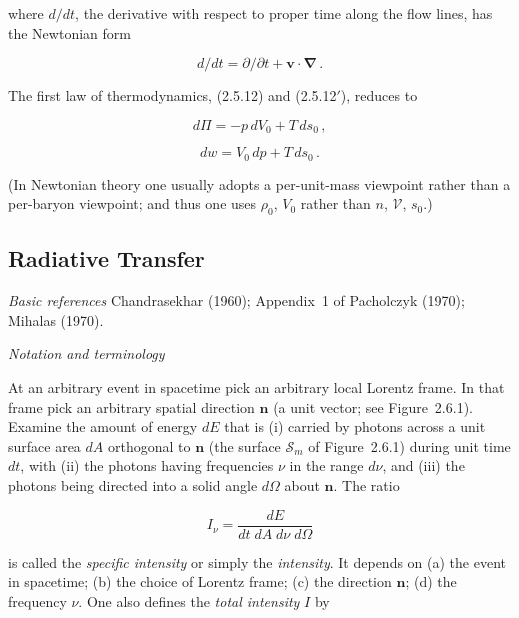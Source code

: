\documentclass[aps,prd,twocolumn,superscriptaddress,nofootinbib]{revtex4-2}
\newcommand{\fvec}[1]{\mathbf{#1}}
\begin{document}
where $d/dt$, the derivative with respect to proper time along the flow lines, has
the Newtonian form

\begin{equation}
d/dt = \partial/\partial t + \fvec{v}\cdot\boldsymbol{\nabla}\,.
\tag{2.5.40}
\end{equation}

The first law of thermodynamics, (2.5.12) and (2.5.12$'$), reduces to

\begin{equation}
d\Pi = -p\,dV_0 + T\,ds_0\,,
\tag{2.5.41}
\end{equation}

\begin{equation}
dw = V_0\,dp + T\,ds_0\,.
\tag{2.5.42}
\end{equation}

(In Newtonian theory one usually adopts a per-unit-mass viewpoint rather than a
per-baryon viewpoint; and thus one uses $\rho_0$, $V_0$ rather than $n$, $\mathcal{V}$, $s_0$.)


\subsection{Radiative Transfer}
\label{sec:2.6}

\textit{Basic references}\quad
Chandrasekhar (1960); Appendix~1 of Pacholczyk (1970); Mihalas (1970).

\bigskip
\textit{Notation and terminology}

At an arbitrary event in spacetime pick an arbitrary
local Lorentz frame.  In that frame pick an arbitrary spatial direction $\fvec{n}$ (a
unit vector; see Figure~2.6.1).  Examine the amount of energy $dE$ that is (i) carried
by photons across a unit surface area $dA$ orthogonal to $\fvec{n}$ (the surface $\mathscr{S}_m$ of
Figure~2.6.1) during unit time $dt$, with (ii) the photons having frequencies $\nu$ in
the range $d\nu$, and (iii) the photons being directed into a solid angle $d\Omega$ about
$\fvec{n}$.  The ratio

\begin{equation}
I_\nu = \frac{dE}{dt\;dA\;d\nu\;d\Omega}
\tag{2.6.1}
\end{equation}

is called the \textit{specific intensity} or simply the \textit{intensity}.  It depends on (a) the
event in spacetime; (b) the choice of Lorentz frame; (c) the direction $\fvec{n}$; (d)
the frequency $\nu$.  One also defines the \textit{total intensity} $I$ by
\end{document}
